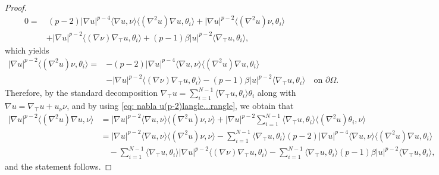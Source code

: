 \documentclass[10pt,a4paper]{amsart}
\numberwithin{equation}{section}
\begin{document}
\begin{proof}
    \begin{equation*}
        \begin{aligned}
        0= & \,(p-2)|\nabla u|^{p-4}\langle\nabla u,\nu\rangle\langle(\nabla^2u)\nabla u,\theta_i\rangle +|\nabla u|^{p-2}\langle(\nabla^2u)\nu,\theta_i\rangle
        \\&+|\nabla u|^{p-2}\langle(\nabla\nu)\nabla_\top u,\theta_i\rangle +(p-1)\beta |u|^{p-2}\langle\nabla_\top u,\theta_i\rangle,
        \end{aligned}
    \end{equation*}
    which yields
    \begin{equation}\label{eq: nabla u(p-2)langle...rangle}
        \begin{aligned}
        |\nabla u|^{p-2}\langle(\nabla^2u)\nu,\theta_i\rangle= & -(p-2)|\nabla u|^{p-4}\langle\nabla u,\nu\rangle\langle(\nabla^2u)\nabla u,\theta_i\rangle\\
        &-|\nabla u|^{p-2}\langle(\nabla\nu)\nabla_\top u,\theta_i\rangle -(p-1)\beta |u|^{p-2}\langle\nabla_\top u,\theta_i\rangle \quad \text{on } \partial\Omega.
        \end{aligned}
    \end{equation}
    Therefore, by the standard decomposition $\displaystyle \nabla_\top u = \sum_{i=1}^{N-1}\langle\nabla_\top u,\theta_i\rangle\theta_i$ along with $\nabla u = \nabla_\top u + u_\nu \nu$, and by using \eqref{eq: nabla u(p-2)langle...rangle}, we obtain that
    \begin{equation*}
        \begin{aligned}
        |\nabla u|^{p-2}\langle(\nabla^2u)\nabla u,\nu\rangle&=|\nabla u|^{p-2}\langle\nabla u,\nu\rangle\langle(\nabla^2u) \nu,\nu\rangle +|\nabla u|^{p-2}\sum_{i=1}^{N-1}\langle\nabla_\top u,\theta_i\rangle\langle(\nabla^2u)\theta_i,\nu\rangle\\
        &=|\nabla u|^{p-2}\langle\nabla u,\nu\rangle\langle(\nabla^2u)\nu,\nu\rangle
        -\sum_{i=1}^{N-1}\langle\nabla_\top u,\theta_i\rangle(p-2)|\nabla u|^{p-4}\langle\nabla u,\nu\rangle\langle(\nabla^2u)\nabla u,\theta_i\rangle\\
        & \quad -\sum_{i=1}^{N-1}\langle\nabla_\top u,\theta_i\rangle|\nabla u|^{p-2}\langle(\nabla\nu)\nabla_\top u,\theta_i\rangle
        -\sum_{i=1}^{N-1}\langle\nabla_\top u,\theta_i\rangle(p-1)\beta|u|^{p-2}\langle\nabla_\top u,\theta_i\rangle,
        \end{aligned}
    \end{equation*}
    and the statement follows.
\end{proof}
\end{document}
